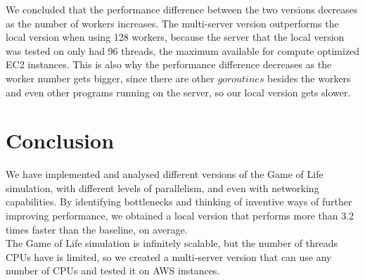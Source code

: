 \documentclass[a4, 11pt]{article}
\begin{document}
\begin{multicols}{2}
{
}%

We concluded that the performance difference between the two versions decreases as the number of workers increases. The multi-server version outperforms the local version when using 128 workers, because the server that the local version was tested on only had 96 threads, the maximum available for compute optimized EC2 instances. This is also why the performance difference decreases as the worker number gets bigger, since there are other $goroutines$ besides the workers and even other programs running on the server, so our local version gets slower.
 
 \section{Conclusion}

We have implemented and analysed different versions of the Game of Life simulation, with different levels of parallelism, and even with networking capabilities. By identifying bottlenecks and thinking of inventive ways of further improving performance, we obtained a local version that performs more than 3.2 times faster than the baseline, on average.\\ The Game of Life simulation is infinitely scalable, but the number of threads CPUs have is limited, so we created a multi-server version that can use any number of CPUs and tested it on AWS instances.


\end{multicols}
\end{document}
